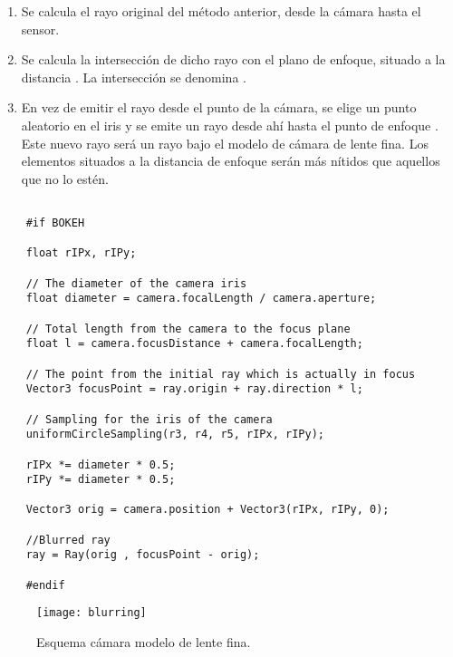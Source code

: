 \begin{enumerate}
		
\item Se calcula el rayo original del método anterior, desde la cámara hasta el sensor.

\item Se calcula la intersección de dicho rayo con el plano de enfoque, situado a la distancia . La intersección se denomina .
	
\item En vez de emitir el rayo desde el punto de la cámara, se elige un punto aleatorio en el iris  y se emite un rayo desde ahí hasta el punto de enfoque . Este nuevo rayo será un rayo bajo el modelo de cámara de lente fina. Los elementos situados a la distancia de enfoque  serán más nítidos que aquellos que no lo estén.
	
\end{enumerate}

\begin{minipage}[c]{0.95\textwidth}
\begin{lstlisting}[label={cod:bokeh}, caption={Código de desenfoque.}]
	
	#if BOKEH
	
    float rIPx, rIPy;

    // The diameter of the camera iris
    float diameter = camera.focalLength / camera.aperture;

    // Total length from the camera to the focus plane
    float l = camera.focusDistance + camera.focalLength;

    // The point from the initial ray which is actually in focus
    Vector3 focusPoint = ray.origin + ray.direction * l;

    // Sampling for the iris of the camera
    uniformCircleSampling(r3, r4, r5, rIPx, rIPy);

    rIPx *= diameter * 0.5;
    rIPy *= diameter * 0.5;

    Vector3 orig = camera.position + Vector3(rIPx, rIPy, 0);

    //Blurred ray
    ray = Ray(orig , focusPoint - orig);

	#endif 

\end{lstlisting}
\end{minipage}

\begin{figure}[H]
	\centering
	\texttt{[image: blurring]}
	\caption{Esquema cámara modelo de lente fina.}
	\label{fig:thinlensecamera}
\end{figure}

